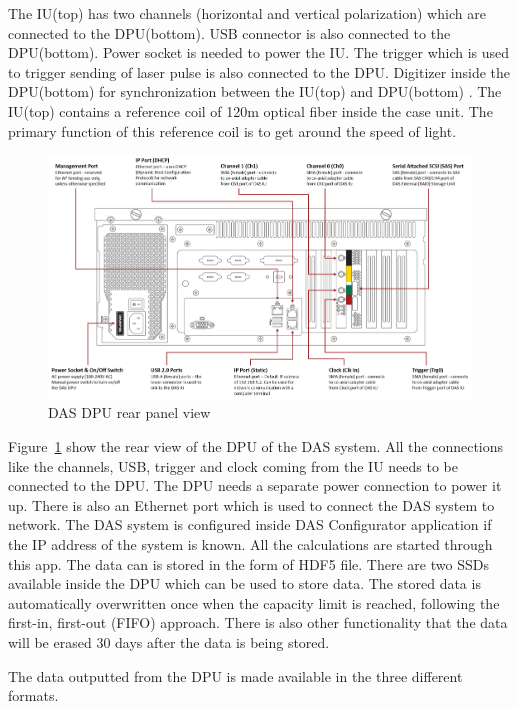 The IU(top) has two channels (horizontal and vertical polarization) which are connected to the DPU(bottom). USB connector is also connected to the DPU(bottom). Power socket is needed to power the IU. The trigger which is used to trigger sending of laser pulse is also connected to the DPU. Digitizer inside the DPU(bottom) for synchronization between the IU(top) and DPU(bottom) . The IU(top) contains a reference coil of 120m optical fiber inside the case unit. The primary function of this reference coil is to get around the speed of light. 

\begin{figure}[h]
    \centering
    \includegraphics[width=\linewidth]{Bilder/jpg/DAS DPU Rear.png}
    \caption{DAS DPU rear panel view~\cite{DAS_Manual}}
    \label{DPU}
\end{figure}

Figure~\ref{DPU} show the rear view of the DPU of the DAS system. All the connections like the channels, USB, trigger and clock coming from the IU needs to be connected to the DPU. The DPU needs a separate power connection to power it up. There is also an Ethernet port which is used to connect the DAS system to network. The DAS system is configured inside DAS Configurator application if the IP address of the system is known. All the calculations are started through this app. The data can is stored in the form of HDF5 file. There are two SSDs available inside the DPU which can be used to store data. The stored data is automatically overwritten once when the capacity limit is reached, following the first-in, first-out (FIFO) approach. There is also other functionality that the data will be erased 30 days after the data is being stored. 

The data outputted from the DPU is made available in the three different formats. 

